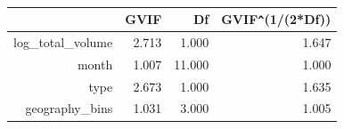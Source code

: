 \documentclass[11pt]{article}\usepackage[]{graphicx}\usepackage[]{color}
\begin{document}
\begin{center}
\begin{table}[ht]
\centering
\begin{tabular}{rrrr}
  \hline
 & GVIF & Df & GVIF\verb|^|(1/(2*Df)) \\ 
  \hline
log\_total\_volume & 2.713 & 1.000 & 1.647 \\ 
  month & 1.007 & 11.000 & 1.000 \\ 
  type & 2.673 & 1.000 & 1.635 \\ 
  geography\_bins & 1.031 & 3.000 & 1.005 \\ 
   \hline
\end{tabular}
\caption{} 
\label{vif_table}
\end{table}

\end{center} 
\end{document}
